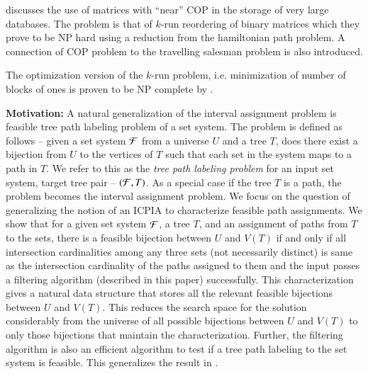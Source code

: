 \documentclass[MS,]{iitmdiss}
\begin{document}



\cite{jkckv04}  discusses the use of matrices
with ``near'' COP in the storage of very large databases.
The problem is that of $k$-run reordering of binary matrices which
they prove to be NP hard using a reduction from the hamiltonian path problem.
A connection of COP problem to the travelling salesman problem is also
introduced. 

The optimization version of the $k$-run problem, i.e. minimization of
number of blocks of ones is proven to be NP complete by
\cite{k77}. 




{\bf Motivation: } A natural generalization of the interval assignment problem is
feasible tree path labeling problem of a set system. The problem is
defined as follows -- given a set system ${\cal F}$ from a universe $U$ and
a tree $T$, does there exist a bijection from $U$ to the vertices of
$T$ such that each set in the system maps to a path in $T$.  We refer
to this as the {\em tree path labeling problem} for an input set
system, target tree pair -- $({\cal F},T)$. As a special case if the tree
$T$ is a path, the problem becomes the interval assignment problem.
We focus on the question of generalizing the notion of an ICPIA
\cite{nsnrs09} to characterize feasible path assignments.  We show
that for a given set system ${\cal F}$, a tree $T$, and an assignment of
paths from $T$ to the sets, there is a feasible bijection between $U$
and $V(T)$ if and only if all intersection cardinalities among any
three sets (not necessarily distinct) is same as the intersection
cardinality of the paths assigned to them and the input passes a
filtering algorithm (described in this paper) successfully.  This
characterization gives a natural data structure that stores all the
relevant feasible bijections between $U$ and $V(T)$. This reduces the
search space for the solution considerably from the universe of all
possible bijections between $U$ and $V(T)$ to only those bijections
that maintain the characterization.  Further, the
filtering algorithm is also an efficient algorithm to test if a tree
path labeling to the set system is feasible.  This generalizes the
result in \cite{nsnrs09}.
\end{document}
